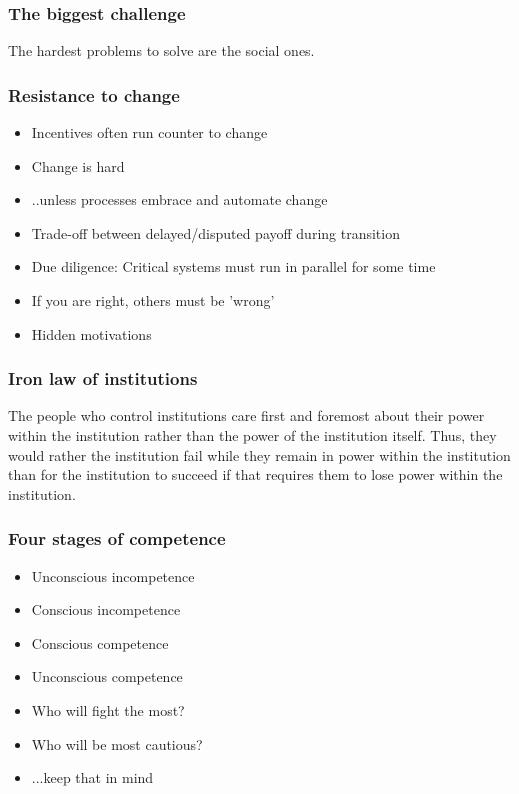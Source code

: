 \documentclass[t]{beamer}
\begin{document}
\begin{frame}
	\frametitle{The biggest challenge}
		\begin{center}
			\vfill
			The hardest problems to solve are the social ones.
			\vfill
		\end{center}
\end{frame}

\begin{frame}
	\frametitle{Resistance to change}
	\begin{itemize}
		\item Incentives often run counter to change
		\item Change is hard
		\item ..unless processes embrace and automate change
		\item Trade-off between delayed/disputed payoff during transition
		\item Due diligence: Critical systems must run in parallel for some time
		\item If you are right, others must be 'wrong'
		\item Hidden motivations
	\end{itemize}
\end{frame}

\begin{frame}
	\frametitle{Iron law of institutions}
	\vfill
	The people who control institutions care first and foremost about their power within the institution rather than the power of the institution itself. Thus, they would rather the institution fail while they remain in power within the institution than for the institution to succeed if that requires them to lose power within the institution.
	\vfill
\end{frame}

\begin{frame}
	\frametitle{Four stages of competence}
	\begin{itemize}
		\item Unconscious incompetence
		\item Conscious incompetence
		\item Conscious competence
		\item Unconscious competence
			\vfill 
		\item Who will fight the most?
		\item Who will be most cautious?
		\item ...keep that in mind
	\end{itemize}
\end{frame}
\end{document}
